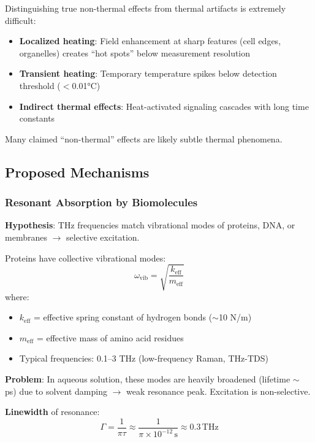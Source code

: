 \begin{warningbox}
Distinguishing true non-thermal effects from thermal artifacts is extremely difficult:
\begin{itemize}
\item \textbf{Localized heating}: Field enhancement at sharp features (cell edges, organelles) creates ``hot spots'' below measurement resolution
\item \textbf{Transient heating}: Temporary temperature spikes below detection threshold ($<$0.01°C)
\item \textbf{Indirect thermal effects}: Heat-activated signaling cascades with long time constants
\end{itemize}
Many claimed ``non-thermal'' effects are likely subtle thermal phenomena.
\end{warningbox}

\subsection{Proposed Mechanisms}

\subsubsection{Resonant Absorption by Biomolecules}

\textbf{Hypothesis}: THz frequencies match vibrational modes of proteins, DNA, or membranes $\rightarrow$ selective excitation.

Proteins have collective vibrational modes:
\begin{equation}
\omega_{\text{vib}} = \sqrt{\frac{k_{\text{eff}}}{m_{\text{eff}}}}
\end{equation}
where:
\begin{itemize}
\item $k_{\text{eff}}$ = effective spring constant of hydrogen bonds ($\sim$10 N/m)
\item $m_{\text{eff}}$ = effective mass of amino acid residues
\item Typical frequencies: 0.1--3 THz (low-frequency Raman, THz-TDS)
\end{itemize}

\textbf{Problem}: In aqueous solution, these modes are heavily broadened (lifetime $\sim$ ps) due to solvent damping $\rightarrow$ weak resonance peak. Excitation is non-selective.

\textbf{Linewidth} of resonance:
\begin{equation}
\Gamma = \frac{1}{\pi \tau} \approx \frac{1}{\pi \times 10^{-12}\,\text{s}} \approx 0.3\,\text{THz}
\end{equation}

